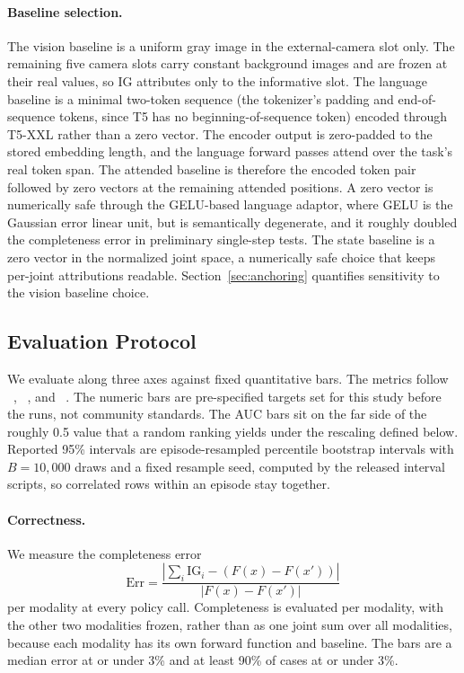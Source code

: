 \documentclass{article}
\begin{document}
\paragraph{Baseline selection.}
The vision baseline is a uniform gray image in the external-camera slot only.
The remaining five camera slots carry constant background images and are frozen at their real values, so IG attributes only to the informative slot.
The language baseline is a minimal two-token sequence (the tokenizer's padding and end-of-sequence tokens, since T5 has no beginning-of-sequence token) encoded through T5-XXL rather than a zero vector.
The encoder output is zero-padded to the stored embedding length, and the language forward passes attend over the task's real token span.
The attended baseline is therefore the encoded token pair followed by zero vectors at the remaining attended positions.
A zero vector is numerically safe through the GELU-based language adaptor, where GELU is the Gaussian error linear unit, but is semantically degenerate, and it roughly doubled the completeness error in preliminary single-step tests.
The state baseline is a zero vector in the normalized joint space, a numerically safe choice that keeps per-joint attributions readable.
Section~\ref{sec:anchoring} quantifies sensitivity to the vision baseline choice.

\subsection{Evaluation Protocol}
\label{sec:metrics}

We evaluate along three axes against fixed quantitative bars.
The metrics follow \citeauthor{sundararajan2017axiomatic}~, \citeauthor{petsiuk2018rise}~, and \citeauthor{adebayo2018sanity}~.
The numeric bars are pre-specified targets set for this study before the runs, not community standards.
The AUC bars sit on the far side of the roughly 0.5 value that a random ranking yields under the rescaling defined below.
Reported 95\% intervals are episode-resampled percentile bootstrap intervals with $B{=}10{,}000$ draws and a fixed resample seed, computed by the released interval scripts, so correlated rows within an episode stay together.

\paragraph{Correctness.}
We measure the completeness error
\begin{equation}
\text{Err} = \frac{\left| \sum_i \mathrm{IG}_i - (F(x) - F(x')) \right|}{\left| F(x) - F(x') \right|}
\end{equation}
per modality at every policy call.
Completeness is evaluated per modality, with the other two modalities frozen, rather than as one joint sum over all modalities, because each modality has its own forward function and baseline.
The bars are a median error at or under 3\% and at least 90\% of cases at or under 3\%.
\end{document}

